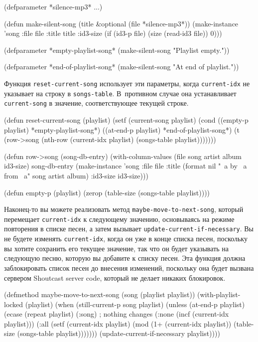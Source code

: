\begin{myverb}
(defparameter *silence-mp3* ...)

(defun make-silent-song (title &optional (file *silence-mp3*))
  (make-instance
   'song 
   :file file
   :title title
   :id3-size (if (id3-p file) (size (read-id3 file)) 0)))

(defparameter *empty-playlist-song* (make-silent-song "Playlist empty."))

(defparameter *end-of-playlist-song* (make-silent-song "At end of playlist."))
\end{myverb}

Функция \lstinline{reset-current-song} использует эти параметры, когда \lstinline{current-idx} не
указывает на строку в \lstinline{songs-table}.  В~противном случае она устанавливает
\lstinline{current-song} в значение, соответствующее текущей строке.

\begin{myverb}
(defun reset-current-song (playlist)
  (setf
   (current-song playlist) 
   (cond
     ((empty-p playlist) *empty-playlist-song*)
     ((at-end-p playlist) *end-of-playlist-song*)
     (t (row->song (nth-row (current-idx playlist) (songs-table playlist)))))))

(defun row->song (song-db-entry)
  (with-column-values (file song artist album id3-size) song-db-entry
    (make-instance
     'song
     :file file
     :title (format nil "~a by ~a from ~a" song artist album)
     :id3-size id3-size)))

(defun empty-p (playlist)
  (zerop (table-size (songs-table playlist))))
\end{myverb}

Наконец-то вы можете реализовать метод \lstinline{maybe-move-to-next-song}, который перемещает
\lstinline{current-idx} к следующему значению, основываясь на режиме повторения в списке песен,
а затем вызывает \lstinline{update-current-if-necessary}.  Вы не будете изменять
\lstinline{current-idx}, когда он уже в конце списка песен, поскольку вы хотите сохранить его
текущее значение, так что он будет указывать на следующую песню, которую вы добавите к
списку песен.  Эта функция должна заблокировать список песен до внесения изменений,
поскольку она будет вызвана сервером Shoutcast server code, который не делает никаких
блокировок.

\begin{myverb}
(defmethod maybe-move-to-next-song (song (playlist playlist))
  (with-playlist-locked (playlist)
    (when (still-current-p song playlist)
      (unless (at-end-p playlist)
        (ecase (repeat playlist)
          (:song) ; nothing changes
          (:none (incf (current-idx playlist)))
          (:all  (setf (current-idx playlist)
                       (mod (1+ (current-idx playlist))
                            (table-size (songs-table playlist)))))))
      (update-current-if-necessary playlist))))
\end{myverb}

